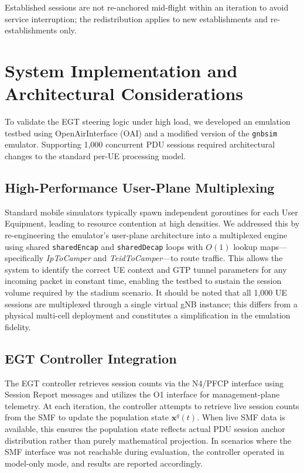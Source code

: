 \documentclass[conference]{IEEEtran}
\begin{document}
Established sessions are not re-anchored mid-flight
within an iteration to avoid service interruption; the
redistribution applies to new establishments and
re-establishments only. 

\section{System Implementation and Architectural Considerations}
\label{sec:implementation}

To validate the EGT steering logic under high load, we
developed an emulation testbed using OpenAirInterface
(OAI) and a modified version of the \texttt{gnbsim}
emulator. Supporting 1,000 concurrent PDU sessions
required architectural changes to the standard
per-UE processing model.

\subsection{High-Performance User-Plane Multiplexing}

Standard mobile simulators typically spawn independent
goroutines for each User Equipment, leading to resource
contention at high densities. We addressed this by
re-engineering the emulator's user-plane architecture
into a multiplexed engine using shared
\texttt{sharedEncap} and \texttt{sharedDecap} loops with
$O(1)$ lookup maps---specifically \textit{IpToCamper}
and \textit{TeidToCamper}---to route traffic. This
allows the system to identify the correct UE context
and GTP tunnel parameters for any incoming packet in
constant time, enabling the testbed to sustain the
session volume required by the stadium scenario.
It should be noted that all 1,000 UE sessions are
multiplexed through a single virtual gNB instance;
this differs from a physical multi-cell deployment and
constitutes a simplification in the emulation
fidelity.

\subsection{EGT Controller Integration}

The EGT controller retrieves session counts via the N4/PFCP 
interface using Session Report messages and utilizes the O1 
interface for management-plane telemetry. At each iteration, 
the controller attempts to retrieve live session counts from 
the SMF to update the population state $\mathbf{x}^g(t)$. 
When live SMF data is available, this ensures the population 
state reflects actual PDU session anchor distribution rather 
than purely mathematical projection. In scenarios where the
SMF interface was not reachable during evaluation, the
controller operated in model-only mode, and results
are reported accordingly.
\end{document}
